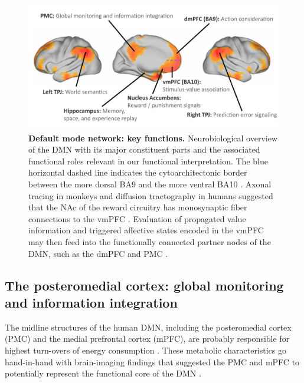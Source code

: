 \documentclass[10pt,letterpaper]{article}
\begin{document}
\begin{figure}[!h]
  \includegraphics[width=.9\linewidth]{neurobiological_overview_DMN.pdf}
  \caption{\textbf{Default mode network: key functions.}
  Neurobiological overview of the DMN with its major constituent parts and
  the associated functional roles relevant in our functional interpretation.
  The blue horizontal dashed line indicates the cytoarchitectonic border between the
  more dorsal BA9 and the more ventral BA10 \citep{brodmann1909vergleichende}.
  Axonal tracing in monkeys and diffusion tractography in humans suggested
  that the NAc of the reward circuitry has monosynaptic fiber connections
  to the vmPFC \citep{haber1995, croxson2005quantitative}. Evaluation of
  propagated value information and triggered affective states encoded
  in the vmPFC may then feed into the functionally connected partner nodes of
  the DMN, such as the dmPFC and PMC \citep{andrews2010, bzdok2013segregation}.
  }
  \label{fig:neurobiological_overview_DMN}
\end{figure}
%
\subsection{The posteromedial cortex: global monitoring and information integration}
The midline structures of the human DMN,
including the posteromedial cortex (PMC) and
the medial prefrontal cortex (mPFC),
are probably responsible for highest turn-overs
of energy consumption \citep{raichle2001pnas, raichle_baseline}.
These metabolic characteristics go hand-in-hand with
brain-imaging findings that suggested the PMC and mPFC to
potentially represent the functional core of the DMN
\citep{andrews2010, hagmann2008mapping}.
\end{document}
